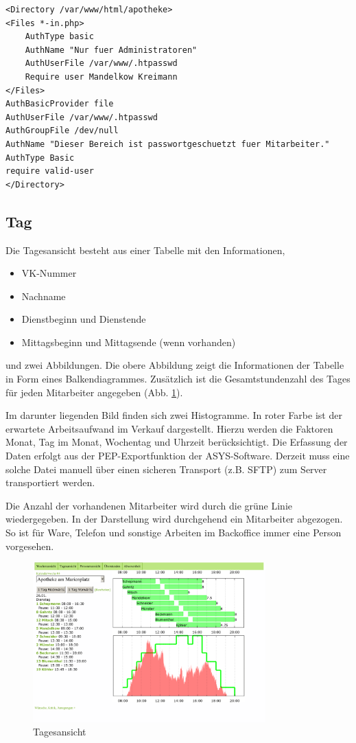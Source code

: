 \documentclass[10pt,a4paper,titlepage,oneside]{article}
\begin{document}
\begin{verbatim}
<Directory /var/www/html/apotheke>
<Files *-in.php>
    AuthType basic
    AuthName "Nur fuer Administratoren"
    AuthUserFile /var/www/.htpasswd
    Require user Mandelkow Kreimann
</Files>
AuthBasicProvider file
AuthUserFile /var/www/.htpasswd
AuthGroupFile /dev/null
AuthName "Dieser Bereich ist passwortgeschuetzt fuer Mitarbeiter."
AuthType Basic
require valid-user
</Directory>
\end{verbatim}





\subsection{Tag}
Die Tagesansicht besteht aus einer Tabelle mit den Informationen,
\begin{itemize}
	\item VK-Nummer
	\item Nachname
	\item Dienstbeginn und Dienstende
	\item Mittagsbeginn und Mittagsende (wenn vorhanden)
\end{itemize} 
und zwei Abbildungen. Die obere Abbildung zeigt die Informationen der Tabelle in Form eines Balkendiagrammes. Zusätzlich ist die Gesamtstundenzahl des Tages für jeden Mitarbeiter angegeben (Abb. \ref{fig:Tagesansicht}). 

Im darunter liegenden Bild finden sich zwei Histogramme. In roter Farbe ist der erwartete Arbeitsaufwand im Verkauf dargestellt. Hierzu werden die Faktoren Monat, Tag im Monat, Wochentag und Uhrzeit berücksichtigt. Die Erfassung der Daten erfolgt aus der PEP-Exportfunktion der ASYS-Software. Derzeit muss eine solche Datei manuell über einen sicheren Transport (z.B. SFTP) zum Server transportiert werden.

Die Anzahl der vorhandenen Mitarbeiter wird durch die grüne Linie wiedergegeben. In der Darstellung wird durchgehend ein Mitarbeiter abgezogen. So ist für Ware, Telefon und sonstige Arbeiten im Backoffice immer eine Person vorgesehen.
\begin{figure}[h]
\centering
\includegraphics[width=0.8\textwidth]{tag-out}
\caption{Tagesansicht}
\label{fig:Tagesansicht}
\end{figure}
\end{document}
